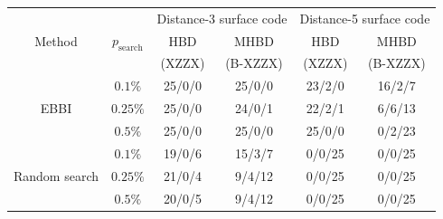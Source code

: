 \begin{tabular}{cc|cc|cc}
    \multirow{3}{*}{Method} & \multirow{3}{*}{$p_\mathrm{search}$} & \multicolumn{2}{c|}{Distance-3 surface code} & \multicolumn{2}{c}{Distance-5 surface code} \\
     &  & HBD & MHBD & HBD & MHBD \\
     &  & (XZZX) & (B-XZZX) & (XZZX) & (B-XZZX) \\
    \hline
    \multirow{3}{*}{EBBI} & $0.1\%$ & 25/0/0 & 25/0/0 & 23/2/0 & 16/2/7 \\
     & $0.25\%$ & 25/0/0 & 24/0/1 & 22/2/1 & 6/6/13 \\
     & $0.5\%$ & 25/0/0 & 25/0/0 & 25/0/0 & 0/2/23 \\
    \hline
    \multirow{3}{*}{Random search} & $0.1\%$ & 19/0/6 & 15/3/7 & 0/0/25 & 0/0/25 \\
     & $0.25\%$ & 21/0/4 & 9/4/12 & 0/0/25 & 0/0/25 \\
     & $0.5\%$ & 20/0/5 & 9/4/12 & 0/0/25 & 0/0/25 \\
\end{tabular}